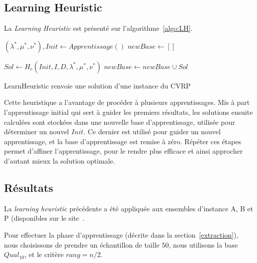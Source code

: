 \documentclass[a4paper,11pt]{article}%
\begin{document}
\subsection{Learning Heuristic}
La \emph{Learning Heuristic} est présenté sur l'algorithme~\ref{algo:LH}.

\begin{algorithm}
\DontPrintSemicolon %
$(\lambda^*,\mu^*,\nu^*), Init \gets Apprentissage()$\;
$newBase \gets []$\;
 {
	 {
		
		 {
			$Sol \gets H_c(Init,I,D,\lambda^*,\mu^*,\nu^*)$\;
			$newBase \gets newBase \cup Sol$\;
			}	
		
	}
}
\;
\caption{{\sc LearnHeuristic} renvoie une solution d'une instance du CVRP}
\label{algo:LH}
\end{algorithm}

Cette heuristique a l'avantage de procéder à plusieurs apprentissages. 
Mis à part l'apprentissage initial qui sert à guider les premiers résultats, les solutions ensuite calculées sont stockées dans une nouvelle base d'apprentissage, utilisée pour déterminer un nouvel $Init$.
Ce dernier est utilisé pour guider un nouvel apprentissage, et la base d'apprentissage est remise à zéro. 
Répéter ces étapes permet d'affiner l'apprentissage, pour le rendre plus efficace et ainsi approcher d'autant mieux la solution optimale.


\subsection{Résultats}

La \emph{learning heuristic} précédente a été appliquée aux ensembles d'instance A, B et P (disponibles sur le site~\cite{cvrplib}.

Pour effectuer la phase d'apprentissage (décrite dans la section~\ref{extraction}), nous choisissons de prendre un échantillon de taille $50$, nous utilisons la base $Qual_{10}$, et le critère $ rang = n/2$.
\end{document}
